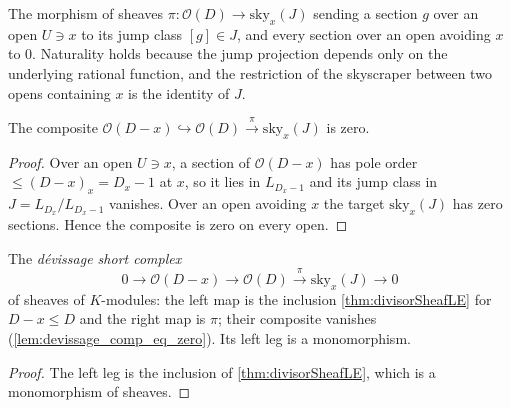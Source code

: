 \begin{definition}
  \label{def:devissagePi}
  \leanok
  The morphism of sheaves \(\pi : \mathcal O(D) \to \mathrm{sky}_x(J)\) sending a section \(g\) over
  an open \(U \ni x\) to its jump class \([g] \in J\), and every section over an open avoiding \(x\)
  to \(0\). Naturality holds because the jump projection depends only on the underlying rational
  function, and the restriction of the skyscraper between two opens containing \(x\) is the identity
  of \(J\).
\end{definition}

\begin{lemma}
  \label{lem:devissage_comp_eq_zero}
  \leanok
  The composite \(\mathcal O(D-x) \hookrightarrow \mathcal O(D) \xrightarrow{\ \pi\ }
  \mathrm{sky}_x(J)\) is zero.
\end{lemma}
\begin{proof}
  \leanok
  Over an open \(U \ni x\), a section of \(\mathcal O(D-x)\) has pole order \(\le (D-x)_x = D_x - 1\)
  at \(x\), so it lies in \(L_{D_x - 1}\) and its jump class in \(J = L_{D_x}/L_{D_x - 1}\) vanishes.
  Over an open avoiding \(x\) the target \(\mathrm{sky}_x(J)\) has zero sections. Hence the composite
  is zero on every open.
\end{proof}

\begin{definition}
  \label{def:devissageSES}
  \leanok
  The \emph{dévissage short complex}
  \[
    0 \longrightarrow \mathcal O(D-x) \longrightarrow \mathcal O(D)
      \xrightarrow{\ \pi\ } \mathrm{sky}_x(J) \longrightarrow 0
  \]
  of sheaves of \(K\)-modules: the left map is the inclusion \ref{thm:divisorSheafLE} for
  \(D - x \le D\) and the right map is \(\pi\); their composite vanishes
  (\ref{lem:devissage_comp_eq_zero}). Its left leg is a monomorphism.
\end{definition}
\begin{proof}
  \leanok
  The left leg is the inclusion of \ref{thm:divisorSheafLE}, which is a monomorphism of sheaves.
\end{proof}

